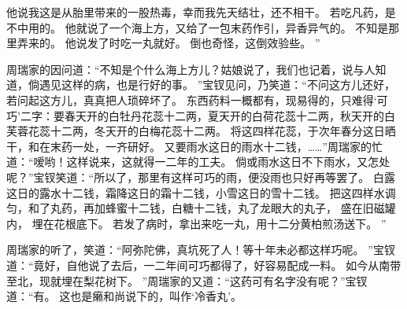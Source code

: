 他说我这是从胎里带来的一股热毒，幸而我先天结壮，还不相干。
若吃凡药，是不中用的。
他就说了一个海上方，又给了一包末药作引，异香异气的。
不知是那里弄来的。
他说发了时吃一丸就好。
倒也奇怪，这倒效验些。
”\par
周瑞家的因问道：“不知是个什么海上方儿？姑娘说了，我们也记着，说与人知道，倘遇见这样的病，也是行好的事。
”宝钗见问，乃笑道：“不问这方儿还好，若问起这方儿，真真把人琐碎坏了。
东西药料一概都有，现易得的，只难得‘可巧’二字：要春天开的白牡丹花蕊十二两，夏天开的白荷花蕊十二两，秋天开的白芙蓉花蕊十二两，冬天开的白梅花蕊十二两。
将这四样花蕊，于次年春分这日晒干，和在末药一处，一齐研好。
又要雨水这日的雨水十二钱，……”周瑞家的忙道：“嗳哟！这样说来，这就得一二年的工夫。
倘或雨水这日不下雨水，又怎处呢？”宝钗笑道：“所以了，那里有这样可巧的雨，便没雨也只好再等罢了。
白露这日的露水十二钱，霜降这日的霜十二钱，小雪这日的雪十二钱。
把这四样水调匀，和了丸药，再加蜂蜜十二钱，白糖十二钱，丸了龙眼大的丸子，
盛在旧磁罐内，
埋在花根底下。
若发了病时，拿出来吃一丸，用十二分黄柏煎汤送下。
”\par
周瑞家的听了，笑道：“阿弥陀佛，真坑死了人！等十年未必都这样巧呢。
”宝钗道：“竟好，自他说了去后，一二年间可巧都得了，好容易配成一料。
如今从南带至北，现就埋在梨花树下。
”周瑞家的又道：“这药可有名字没有呢？”宝钗道：“有。
这也是癞和尚说下的，叫作‘冷香丸’。
